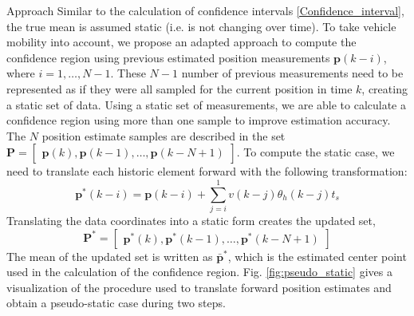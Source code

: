 \begin{section}{Approach}
Similar to the calculation of confidence intervals \eqref{Confidence_interval}, the true mean is assumed static (i.e. is not changing over time). To take vehicle mobility into account, we propose an adapted approach to compute the confidence region using previous estimated position measurements $\bm{p}(k-i)$, where $i=1,\dots,N-1$. These $N-1$ number of previous measurements need to be represented as if they were all sampled for the current position in time $k$, creating a static set of data. Using a static set of measurements, we are able to calculate a confidence region using more than one sample to improve estimation accuracy. The $N$ position estimate samples are described in the set $\bm{P}=\begin{bmatrix} \bm{p}(k) ,\bm{p}(k-1),\dots,\bm{p}(k-N+1) \end{bmatrix} $.
To compute the static case, we need to translate each historic element forward with the following transformation:
	\begin{equation}
	\bm{p}^*(k-i) = \bm{p}(k-i)+\sum_{j=i}^1 v(k-j)\theta_h(k-j)t_s 
	\end{equation}
Translating the data coordinates into a static form creates the updated set,
\begin{equation}
    \bm{P}^*=\begin{bmatrix} \bm{p}^*(k) ,\bm{p}^*(k-1),\dots,\bm{p}^*(k-N+1) \end{bmatrix} \nonumber
\end{equation}
The mean of the updated set is written as $\bar{\bm{p}}^*$, which is the estimated center point used in the calculation of the confidence region. Fig. \ref{fig:pseudo_static} gives a visualization of the procedure used to translate forward position estimates and obtain a pseudo-static case during two steps.

\begin{figure}[ht!]


\end{figure}
\end{section}
